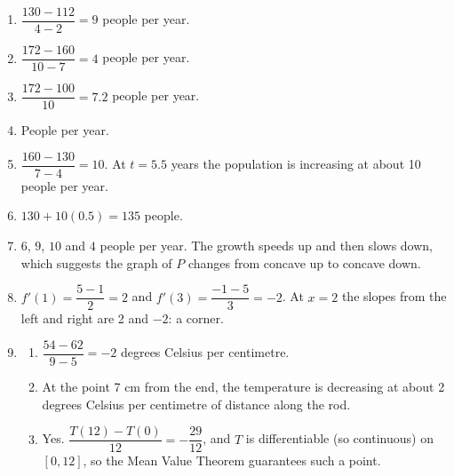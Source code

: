 \documentclass[11pt]{article}
\begin{document}
\newpage
\begin{solbox}
\begin{enumerate}[leftmargin=*,itemsep=4pt]
  \item $\dfrac{130-112}{4-2}=9$ people per year.
  \item $\dfrac{172-160}{10-7}=4$ people per year.
  \item $\dfrac{172-100}{10}=7.2$ people per year.
  \item People per year.
  \item $\dfrac{160-130}{7-4}=10$. At $t=5.5$ years the population is increasing at about 10 people per year.
  \item $130+10(0.5)=135$ people.
  \item $6$, $9$, $10$ and $4$ people per year. The growth speeds up and then slows down, which suggests the graph of $P$ changes from concave up to concave down.
  \item $f'(1)=\dfrac{5-1}{2}=2$ and $f'(3)=\dfrac{-1-5}{3}=-2$. At $x=2$ the slopes from the left and right are 2 and $-2$: a corner.
  \item \begin{enumerate}[label=(\alph*),leftmargin=*,itemsep=3pt]
    \item $\dfrac{54-62}{9-5}=-2$ degrees Celsius per centimetre.
    \item At the point 7 cm from the end, the temperature is decreasing at about 2 degrees Celsius per centimetre of distance along the rod.
    \item Yes. $\dfrac{T(12)-T(0)}{12}=-\dfrac{29}{12}$, and $T$ is differentiable (so continuous) on $[0,12]$, so the Mean Value Theorem guarantees such a point.
  \end{enumerate}
\end{enumerate}
\end{solbox}
\end{document}

